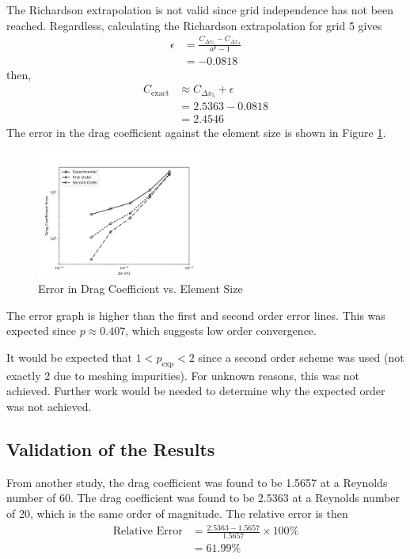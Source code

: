 The Richardson extrapolation is not valid since grid independence has not been reached. Regardless, calculating the Richardson extrapolation for grid 5 gives
\begin{align*}
    \epsilon &= \frac{C_{\Delta x_5} - C_{\Delta x_4}}{a^p - 1} \\
    &= -0.0818
\end{align*}
then,
\begin{align*}
    C_{\text{exact}} &\approx C_{\Delta x_5} + \epsilon \\
    &= 2.5363 - 0.0818 \\
    &= 2.4546
\end{align*}
The error in the drag coefficient against the element size is shown in Figure \ref{fig:richardson_error_vs_element_size}. 
\begin{figure}[H]
    \centering
    \includegraphics[width=0.5\textwidth]{Questions/Figures/richardson_error_vs_element_size.png}
    \caption{Error in Drag Coefficient vs. Element Size}
    \label{fig:richardson_error_vs_element_size}
\end{figure}
The error graph is higher than the first and second order error lines. This was expected since $p \approx 0.407$, which suggests low order convergence.

It would be expected that $1 < p_{\text{exp}} < 2$ since a second order scheme was used (not exactly 2 due to meshing impurities). For unknown reasons, this was not achieved. Further work would be needed to determine why the expected order was not achieved.

\subsection{Validation of the Results}
From another study, the drag coefficient was found to be  1.5657 \cite{paper} at a Reynolds number of 60. The drag coefficient was found to be 2.5363 at a Reynolds number of 20, which is the same order of magnitude. The relative error is then
\begin{align*}
    \text{Relative Error} &= \frac{2.5363 - 1.5657}{1.5657} \times 100\% \\
    &= \boxed{61.99\%}
\end{align*}